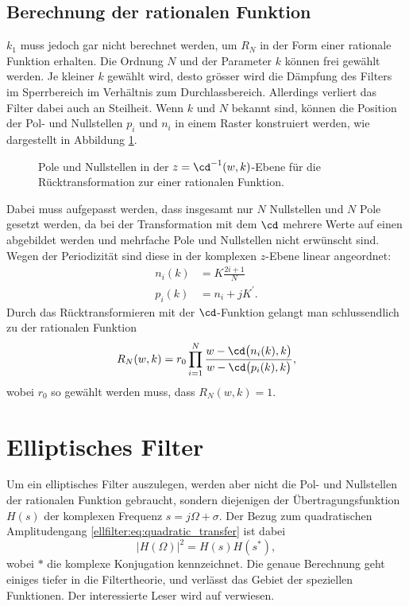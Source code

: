 \subsection{Berechnung der rationalen Funktion}

$k_1$ muss jedoch gar nicht berechnet werden, um $R_N$ in der Form einer rationale Funktion erhalten.
Die Ordnung $N$ und der Parameter $k$ können frei gewählt werden.
Je kleiner $k$ gewählt wird, desto grösser wird die Dämpfung des Filters im Sperrbereich im Verhältnis zum Durchlassbereich.
Allerdings verliert das Filter dabei auch an Steilheit.
Wenn $k$ und $N$ bekannt sind, können die Position der Pol- und Nullstellen $p_i$ und $n_i$ in einem Raster konstruiert werden, wie dargestellt in Abbildung \ref{ellfilter:fig:pn}.
\begin{figure}
    \centering
    
    \caption{
        Pole und Nullstellen in der $z = \cd^{-1}(w, k)$-Ebene für die Rücktransformation zur einer rationalen Funktion.
    }
    \label{ellfilter:fig:pn}
\end{figure}
Dabei muss aufgepasst werden, dass insgesamt nur $N$ Nullstellen und $N$ Pole gesetzt werden, da bei der Transformation mit dem $\cd$ mehrere Werte auf einen abgebildet werden und mehrfache Pole und Nullstellen nicht erwünscht sind.
Wegen der Periodizität sind diese in der komplexen $z$-Ebene linear angeordnet:
\begin{align}
    n_i(k) &= K\frac{2i+1}{N} \\
    p_i(k) &= n_i + jK^\prime.
\end{align}
Durch das Rücktransformieren mit der $\cd$-Funktion gelangt man schlussendlich zu der rationalen Funktion
\begin{equation}
    R_N(w, k) = r_0 \prod_{i=1}^N \frac{w - \cd \big(n_i(k), k \big)}{w - \cd \big(p_i(k), k \big)},
\end{equation}
wobei $r_0$ so gewählt werden muss, dass $R_N(w, k) = 1$.

\section{Elliptisches Filter}

Um ein elliptisches Filter auszulegen, werden aber nicht die Pol- und Nullstellen der rationalen Funktion gebraucht, sondern diejenigen der Übertragungsfunktion $H(s)$ der komplexen Frequenz $s = j\Omega + \sigma$.
Der Bezug zum quadratischen Amplitudengang \eqref{ellfilter:eq:quadratic_transfer} ist dabei
\begin{equation}
    |H(\Omega)|^2 = H(s) H(s^*),
\end{equation}
wobei $*$ die komplexe Konjugation kennzeichnet.
Die genaue Berechnung geht einiges tiefer in die Filtertheorie, und verlässt das Gebiet der speziellen Funktionen.
Der interessierte Leser wird auf \cite[Kapitel~5]{ellfilter:bib:orfanidis} verwiesen.
